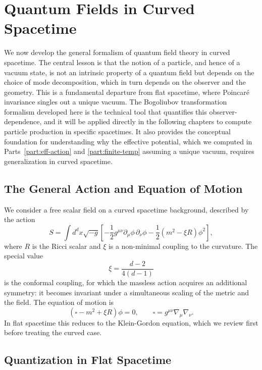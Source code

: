 \chapter{Quantum Fields in Curved Spacetime}
\label{ch:qft-curved}
We now develop the general formalism of quantum field theory in curved
spacetime. The central lesson is that the notion of a particle, and
hence of a vacuum state, is not an intrinsic property of a quantum
field but depends on the choice of mode decomposition, which in turn
depends on the observer and the geometry. This is a fundamental
departure from flat spacetime, where Poincar\'{e} invariance singles
out a unique vacuum. The Bogoliubov transformation formalism developed
here is the technical tool that quantifies this observer-dependence,
and it will be applied directly in the following chapters to compute
particle production in specific spacetimes. It also provides the
conceptual foundation for understanding why the effective potential,
which we computed in Parts~\ref{part:eff-action} and
\ref{part:finite-temp} assuming a unique vacuum, requires
generalization in curved spacetime.

\section{The General Action and Equation of Motion}

We consider a free scalar field on a curved spacetime background,
described by the action
\begin{equation}
	S = \int d^dx\sqrt{-g}\left[
		-\frac{1}{2}g^{\mu\nu}\partial_\mu\phi\,\partial_\nu\phi
		- \frac{1}{2}(m^2 - \xi R)\phi^2\right],
\end{equation}
where $R$ is the Ricci scalar and $\xi$ is a non-minimal coupling to
the curvature. The special value
\begin{equation}
	\xi = \frac{d-2}{4(d-1)}
\end{equation}
is the conformal coupling, for which the massless action acquires an
additional symmetry: it becomes invariant under a simultaneous scaling
of the metric and the field. The equation of motion is
\begin{equation}
	\left(\square - m^2 + \xi R\right)\phi = 0,
	\qquad \square = g^{\mu\nu}\nabla_\mu\nabla_\nu.
\end{equation}
In flat spacetime this reduces to the Klein-Gordon equation, which we
review first before treating the curved case.

\section{Quantization in Flat Spacetime}

